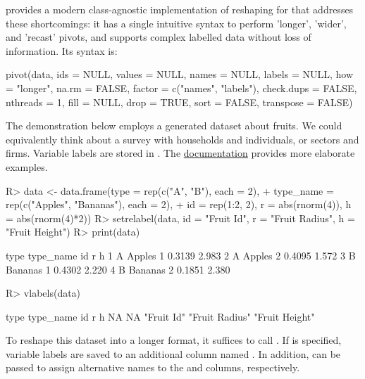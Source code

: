 \documentclass[nojss]{jss} %
\begin{document}
 provides a modern class-agnostic implementation of reshaping for  that addresses these shortcomings: it has a single intuitive syntax to perform 'longer', 'wider', and 'recast' pivots, and supports complex labelled data without loss of information. Its syntax is:
%
\begin{Code}
pivot(data, ids = NULL, values = NULL, names = NULL, labels = NULL,
  how = "longer", na.rm = FALSE, factor = c("names", "labels"),
  check.dups = FALSE, nthreads = 1, fill = NULL, drop = TRUE,
  sort = FALSE, transpose = FALSE)
\end{Code}
%
The demonstration below employs a generated dataset about fruits. We could equivalently think about a survey with households and individuals, or sectors and firms. Variable labels are stored in . The \href{https://sebkrantz.github.io/collapse/reference/pivot.html#ref-examples}{documentation} provides more elaborate examples.
%
\begin{Schunk}
\begin{Sinput}
R> data <- data.frame(type = rep(c("A", "B"), each = 2),
+    type_name = rep(c("Apples", "Bananas"), each = 2),
+    id = rep(1:2, 2), r = abs(rnorm(4)), h = abs(rnorm(4)*2))
R> setrelabel(data, id = "Fruit Id", r = "Fruit Radius", h = "Fruit Height")
R> print(data)
\end{Sinput}
\begin{Soutput}
  type type_name id      r     h
1    A    Apples  1 0.3139 2.983
2    A    Apples  2 0.4095 1.572
3    B   Bananas  1 0.4302 2.220
4    B   Bananas  2 0.1851 2.380
\end{Soutput}
\begin{Sinput}
R> vlabels(data)
\end{Sinput}
\begin{Soutput}
          type      type_name             id              r              h 
            NA             NA     "Fruit Id" "Fruit Radius" "Fruit Height" 
\end{Soutput}
\end{Schunk}
%
To reshape this dataset into a longer format, it suffices to call . If  is specified, variable labels are saved to an additional column named . In addition,  can be passed to assign alternative names to the  and  columns, respectively.
%
\end{document}
